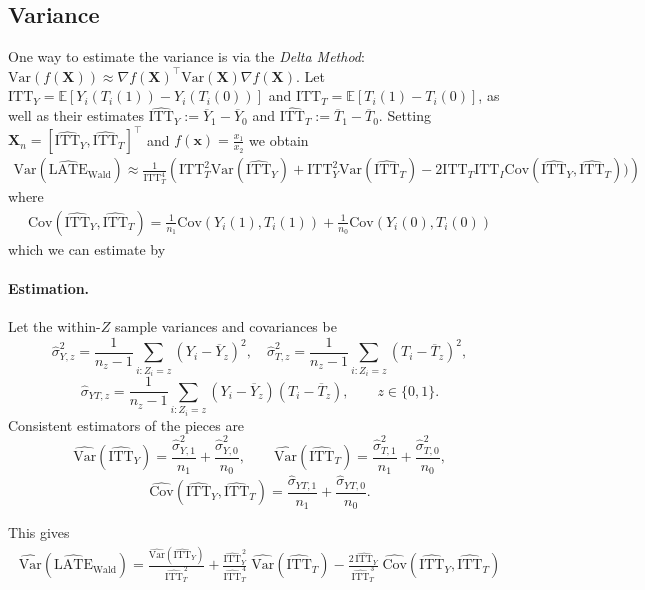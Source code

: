 \documentclass[11pt]{exam}
\theoremstyle{plain}
\newcommand{\E}{\mathbb{E}}
\newcommand{\bX}{\bm{X}}
\newcommand{\LATE}{\mathrm{LATE}}
\newcommand{\ITT}{\mathrm{ITT}}
\newcommand{\Var}{\mathrm{Var}}
\newcommand{\Cov}{\mathrm{Cov}}
\begin{document}
\subsection{Variance}
One way to estimate the variance is via the \emph{Delta Method}: $\Var(f(\bX)) \approx \nabla f(\bX)^\top \Var(\bX) \nabla f(\bX)$. Let $\ITT_Y = \E[Y_i(T_i(1)) - Y_i(T_i(0))]$ and $\ITT_T = \E[T_i(1) - T_i(0)]$, as well as their estimates $\widehat{\ITT}_Y := \overline{Y}_1 - \overline{Y}_0$ and $\widehat{\ITT}_T := \overline{T}_1 - \overline{T}_0$. Setting $\bX_n = [\widehat{\ITT}_Y, \widehat{\ITT}_T]^\top$ and $f(\bm{x}) = \frac{x_1}{x_2}$ we obtain
\begin{align*}
    \Var(\widehat{\LATE}_{\text{Wald}}) \approx \frac{1}{\ITT_T^4} \left(\ITT_T^2 \Var(\widehat{\ITT}_Y) + \ITT_Y^2 \Var(\widehat{\ITT}_T) - 2\ITT_T \ITT_I \Cov(\widehat{\ITT}_Y, \widehat{\ITT}_T))\right)
\end{align*}
where 
\begin{align*}
    \Cov(\widehat{\ITT}_Y, \widehat{\ITT}_T) = \frac{1}{n_1}\Cov(Y_i(1), T_i(1)) + \frac{1}{n_0}\Cov(Y_i(0), T_i(0))
\end{align*}
which we can estimate by

\paragraph{Estimation.}

Let the within-$Z$ sample variances and covariances be
\[
\hat{\sigma}^2_{Y,z}=\frac{1}{n_z-1}\sum_{i:Z_i=z}\!\left(Y_i-\overline{Y}_z\right)^2,\quad
\hat{\sigma}^2_{T,z}=\frac{1}{n_z-1}\sum_{i:Z_i=z}\!\left(T_i-\overline{T}_z\right)^2,
\]
\[
\hat{\sigma}_{YT,z}=\frac{1}{n_z-1}\sum_{i:Z_i=z}\!\left(Y_i-\overline{Y}_z\right)\!\left(T_i-\overline{T}_z\right),\qquad z\in\{0,1\}.
\]
Consistent estimators of the pieces are
\[
\widehat{\Var}(\widehat{\ITT}_Y)=\frac{\hat{\sigma}^2_{Y,1}}{n_1}+\frac{\hat{\sigma}^2_{Y,0}}{n_0},\qquad
\widehat{\Var}(\widehat{\ITT}_T)=\frac{\hat{\sigma}^2_{T,1}}{n_1}+\frac{\hat{\sigma}^2_{T,0}}{n_0},
\]
\[
\widehat{\Cov}(\widehat{\ITT}_Y,\widehat{\ITT}_T)
=\frac{\hat{\sigma}_{YT,1}}{n_1}+\frac{\hat{\sigma}_{YT,0}}{n_0}.
\]

This gives
\begin{align*}
\widehat{\Var}\!\left(\widehat{\LATE}_{\text{Wald}}\right)
=\frac{\widehat{\Var}(\widehat{\ITT}_Y)}{\widehat{\ITT}_T^{\,2}}
+\frac{\widehat{\ITT}_Y^{\,2}}{\widehat{\ITT}_T^{\,4}}\;\widehat{\Var}(\widehat{\ITT}_T)
-\frac{2\,\widehat{\ITT}_Y}{\widehat{\ITT}_T^{\,3}}\;\widehat{\Cov}(\widehat{\ITT}_Y,\widehat{\ITT}_T)
\end{align*}
\end{document}
